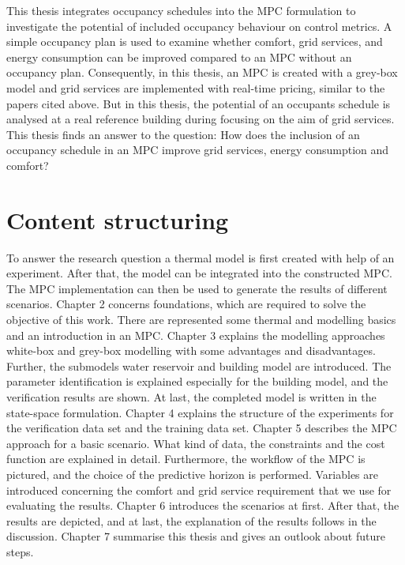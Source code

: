     This thesis integrates occupancy schedules into the MPC formulation to investigate the potential of included occupancy behaviour on control metrics. A simple occupancy plan is used to examine whether comfort, grid services, and energy consumption can be improved compared to an MPC without an occupancy plan. Consequently, in this thesis, an MPC is created with a grey-box model and grid services are implemented with real-time pricing, similar to the papers cited above. But in this thesis, the potential of an occupants schedule is analysed at a real reference building during focusing on the aim of grid services. This thesis finds an answer to the question: How does the inclusion of an occupancy schedule in an MPC improve grid services, energy consumption and comfort? 

\section{Content structuring}
\label{section:contentstructuring}
To answer the research question a thermal model is first created with help of an experiment. After that, the model can be integrated into the constructed MPC. The MPC implementation can then be used to generate the results of different scenarios.
Chapter 2 concerns foundations, which are required to solve the objective of this work. There are represented some thermal and modelling basics and an introduction in an MPC.
Chapter 3 explains the modelling approaches white-box and grey-box modelling with some advantages and disadvantages. Further, the submodels water reservoir and building model are introduced. The parameter identification is explained especially for the building model, and the verification results are shown. At last, the completed model is written in the state-space formulation.
Chapter 4 explains the structure of the experiments for the verification data set and the training data set.
Chapter 5 describes the MPC approach for a basic scenario. What kind of data, the constraints and the cost function are explained in detail. Furthermore, the workflow of the MPC is pictured, and the choice of the predictive horizon is performed. Variables are introduced concerning the comfort and grid service requirement that we use for evaluating the results.
Chapter 6 introduces the scenarios at first. After that, the results are depicted, and at last, the explanation of the results follows in the discussion.
Chapter 7 summarise this thesis and gives an outlook about future steps.
